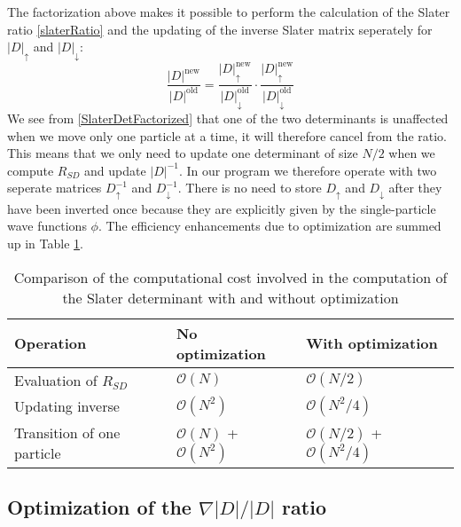 \documentclass[english, a4paper]{article}
\begin{document}
\noindent The factorization above makes it possible to perform the calculation of the Slater ratio \eqref{slaterRatio}
and the updating of the inverse Slater matrix seperately for $|D|_\uparrow$ and $|D|_\downarrow$:
\begin{equation}
 \frac{|D|^{\textrm{new}}}{|D|^{\textrm{old}}} = \frac{|D|^{\textrm{new}}_\uparrow}{|D|^{\textrm{old}}_\downarrow}
 \cdot
 \frac{|D|^{\textrm{new}}_\uparrow}{|D|^{\textrm{old}}_\downarrow}
\end{equation}
We see from \eqref{SlaterDetFactorized} that one of the two determinants is unaffected
when we move only one particle at a time, it will therefore cancel from the ratio. This means
that we only need to update one determinant of size $N/2$ when we compute $R_{SD}$
and update $|D|^{-1}$. In our program we therefore operate with two seperate matrices
$D_\uparrow^{-1}$ and $D_\downarrow^{-1}$. There is no need to store $D_\uparrow$ and $D_\downarrow$
after they have been inverted once because they are explicitly given by the single-particle wave
functions $\phi$. 
The efficiency enhancements due to optimization are summed up in Table \ref{tab:optimization}.
\begin{table}[H] 
  \begin{center}
    \begin{tabular*}{14cm}{@{\extracolsep{\fill}} lll}
      \toprule
      Operation & No optimization & With optimization  \\ 
      \hline
      Evaluation of $R_{SD}$  & $\mathcal{O}(N)$ & $\mathcal{O}(N/2)$ \\
      Updating inverse  & $\mathcal{O}(N^2)$ & $\mathcal{O}(N^2/4)$ \\ 
      Transition of one particle & $\mathcal{O}(N)$ + $\mathcal{O}(N^2)$ &
                                   $\mathcal{O}(N/2)$ + $\mathcal{O}(N^2/4)$ \\ 
      \bottomrule
      \end{tabular*} 
    \end{center}
    \captionsetup{width=14cm}
      \caption {Comparison of the computational cost involved in the computation of the
                Slater determinant with and without optimization} 
  \label{tab:optimization} 
\end{table}


\subsection{Optimization of the $\nabla |D| / |D|$ ratio}
\end{document}
